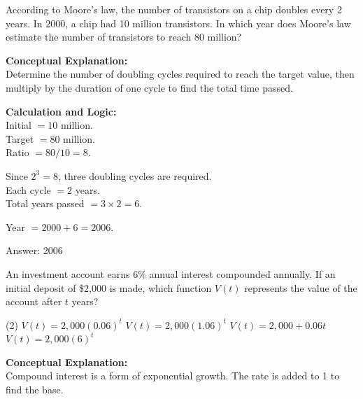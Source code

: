 \documentclass[11pt,paper=a4,answers]{exam}
\begin{document}
\begin{questions}
\question
According to Moore’s law, the number of transistors on a chip doubles every 2 years. In 2000, a chip had 10 million transistors. In which year does Moore’s law estimate the number of transistors to reach 80 million?

\begin{solution}
\textbf{Conceptual Explanation:} \\
Determine the number of doubling cycles required to reach the target value, then multiply by the duration of one cycle to find the total time passed.

\vspace{20pt}

\textbf{Calculation and Logic:} \\
Initial $= 10$ million. \\
Target $= 80$ million. \\
Ratio $= 80/10 = 8$.

\vspace{10pt}

Since $2^3 = 8$, three doubling cycles are required. \\
Each cycle $= 2$ years. \\
Total years passed $= 3 \times 2 = 6$.

\vspace{10pt}

Year $= 2000 + 6 = 2006$.

\vspace{25pt}

Answer: \colorbox{yellow!100}{2006}
\end{solution}

\vspace{40pt}

\question
An investment account earns 6\% annual interest compounded annually. If an initial deposit of \$2,000 is made, which function $V(t)$ represents the value of the account after $t$ years?
\begin{tasks}(2)
    \task $V(t) = 2,000(0.06)^t$
    \task $V(t) = 2,000(1.06)^t$
    \task $V(t) = 2,000 + 0.06t$
    \task $V(t) = 2,000(6)^t$
\end{tasks}

\begin{solution}
\textbf{Conceptual Explanation:} \\
Compound interest is a form of exponential growth. The rate is added to 1 to find the base.


\end{solution}
\end{questions}
\end{document}
